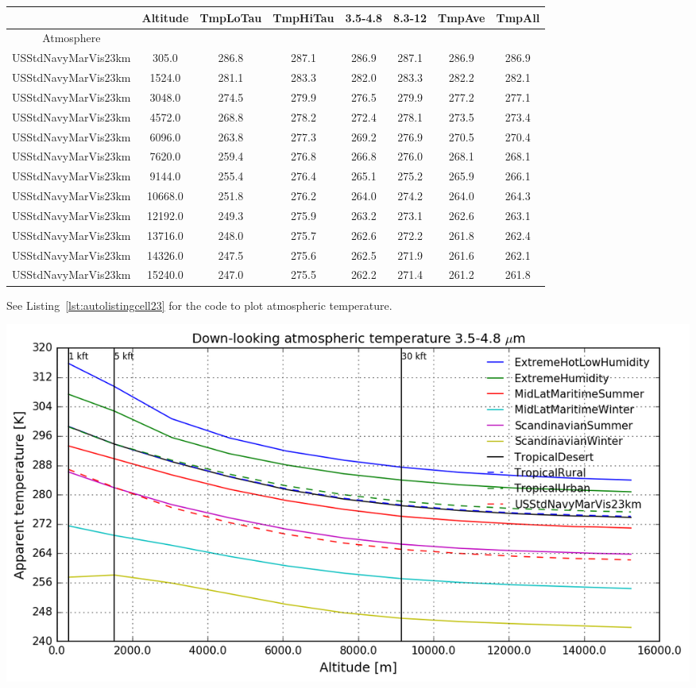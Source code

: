 \documentclass{workpackage}
\begin{document}
\begin{center}

\begin{normalsize}

\begin{tabular}{|c|c|c|c|c|c|c|c|}
\hline
&Altitude&TmpLoTau&TmpHiTau&3.5-4.8&8.3-12&TmpAve&TmpAll\\\hline
Atmosphere&&&&&&&\\\hline
USStdNavyMarVis23km&305.0&286.8&287.1&286.9&287.1&286.9&286.9\\\hline
USStdNavyMarVis23km&1524.0&281.1&283.3&282.0&283.3&282.2&282.1\\\hline
USStdNavyMarVis23km&3048.0&274.5&279.9&276.5&279.9&277.2&277.1\\\hline
USStdNavyMarVis23km&4572.0&268.8&278.2&272.4&278.1&273.5&273.4\\\hline
USStdNavyMarVis23km&6096.0&263.8&277.3&269.2&276.9&270.5&270.4\\\hline
USStdNavyMarVis23km&7620.0&259.4&276.8&266.8&276.0&268.1&268.1\\\hline
USStdNavyMarVis23km&9144.0&255.4&276.4&265.1&275.2&265.9&266.1\\\hline
USStdNavyMarVis23km&10668.0&251.8&276.2&264.0&274.2&264.0&264.3\\\hline
USStdNavyMarVis23km&12192.0&249.3&275.9&263.2&273.1&262.6&263.1\\\hline
USStdNavyMarVis23km&13716.0&248.0&275.7&262.6&272.2&261.8&262.4\\\hline
USStdNavyMarVis23km&14326.0&247.5&275.6&262.5&271.9&261.6&262.1\\\hline
USStdNavyMarVis23km&15240.0&247.0&275.5&262.2&271.4&261.2&261.8\\\hline

\end{tabular}
\end{normalsize}
\end{center}


See Listing~\ref{lst:autolistingcell23} for the code to plot atmospheric temperature.

\begin{center}
\includegraphics{./pic/Analyse-Standard-Atmospheres_23_0.png}
\end{center}
\end{document}
